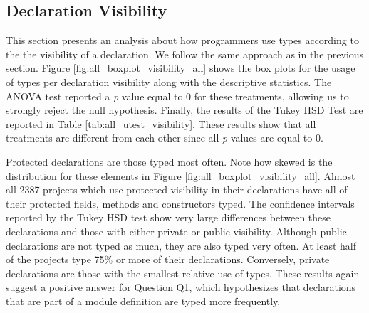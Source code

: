 \documentclass[]{sigplanconf}
\begin{document}
\subsection{Declaration Visibility\label{sec:results-visibility}}

This section presents an analysis about how programmers use types according to the the visibility of a declaration.
We follow the same approach as in the previous section.
Figure \ref{fig:all_boxplot_visibility_all} shows the box plots for the usage of types per declaration visibility along with the descriptive statistics.
The ANOVA test reported a \emph{p} value equal to 0 for these treatments, allowing us to strongly reject the null hypothesis.
Finally, the results of the Tukey HSD Test are reported in Table \ref{tab:all_utest_visibility}.
These results show that all treatments are different from each other since all \emph{p} values are equal to 0.


Protected declarations are those typed most often.
Note how skewed is the distribution for these elements in Figure \ref{fig:all_boxplot_visibility_all}.
Almost all 2387 projects which use protected visibility in their declarations have all of their protected fields, methods and constructors typed.
The confidence intervals reported by the Tukey HSD test show very large differences between these declarations and those with either private or public visibility.
Although public declarations are not typed as much, they are also typed very often.
At least half of the projects type 75\% or more of their declarations.
Conversely, private declarations are those with the smallest relative use of types.
These results again suggest a positive answer for Question Q1, which hypothesizes that declarations that are part of a module definition are typed more frequently.
\end{document}
